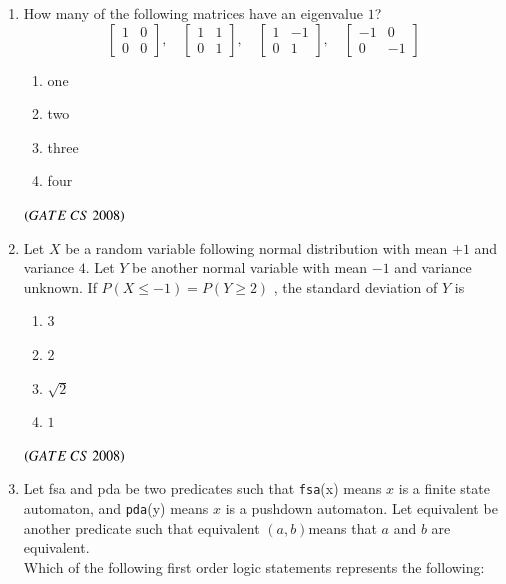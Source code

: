 \documentclass[journal, onecolumn]{IEEEtran}
\numberwithin{equation}{enumi}
\numberwithin{figure}{enumi}
\begin{document}
\begin{enumerate}
\item How many of the following matrices have an eigenvalue $1$?
\[
\begin{bmatrix}
1 & 0 \\
0 & 0
\end{bmatrix},
\quad
\begin{bmatrix}
1 & 1 \\
0 & 1
\end{bmatrix},
\quad
\begin{bmatrix}
1 & -1 \\
0 & 1
\end{bmatrix},
\quad
\begin{bmatrix}
-1 & 0 \\
0 & -1
\end{bmatrix}
\]
\begin{multicols}{4}
\begin{enumerate}
   \item one
   \item two
   \item three
   \item four
\end{enumerate}
\end{multicols}
\hfill $\left(GATE\ CS\  2008\right)$

\item Let $X$ be a random variable following normal distribution with mean $+1$ and variance $4$. Let $Y$ be another normal variable with mean $-1$ and variance unknown. If $P(X\leq-1)= P( Y\geq 2)$ , the standard deviation of $Y$ is 
\vspace{-1em}%
\begin{multicols}{4}
\begin{enumerate}
   \item $3$
   \item $2$
   \item $\sqrt{2}$
   \item $1$
\end{enumerate}
\end{multicols} 
\hfill $\left(GATE\ CS\  2008\right)$

\item Let fsa and pda be two predicates such that \texttt{fsa}(x) means 
$x$ is a finite state automaton, and \texttt{pda}(y) means $x$ is a pushdown automaton.  
Let equivalent be another predicate such that equivalent $(a,b)$means that $a$ and $b$ are equivalent.\\  
Which of the following first order logic statements represents the following:\\


\end{enumerate}
\end{document}
